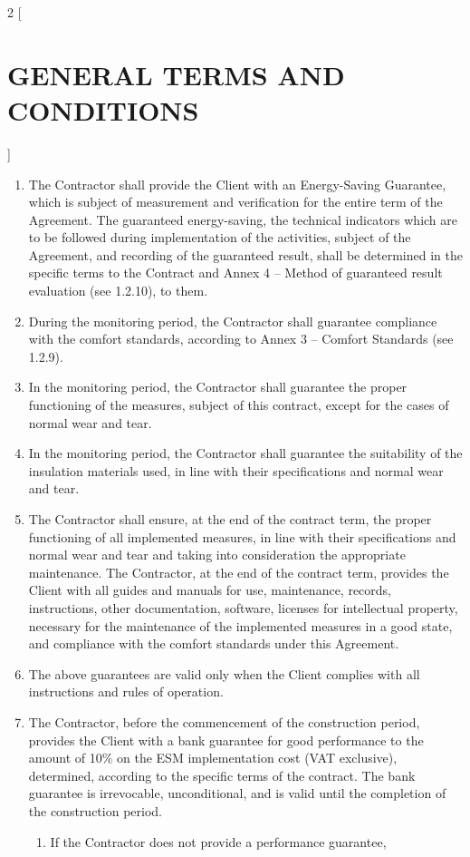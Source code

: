 \begin{multicols}{2} [\section{GENERAL TERMS AND CONDITIONS}]
\begin{enumerate}
  \item The Contractor shall provide the Client with an Energy-Saving
    Guarantee, which is subject of measurement and verification for
    the entire term of the Agreement. The guaranteed energy-saving,
    the technical indicators which are to be followed during
    implementation of the activities, subject of the Agreement, and
    recording of the guaranteed result, shall be determined in the
    specific terms to the Contract and Annex 4 – Method of guaranteed
    result evaluation (see 1.2.10), to them.
  \item During the monitoring period, the Contractor shall guarantee
    compliance with the comfort standards, according to Annex 3 –
    Comfort Standards (see 1.2.9).
  \item In the monitoring period, the Contractor shall guarantee the
    proper functioning of the measures, subject of this contract,
    except for the cases of normal wear and tear.
  \item In the monitoring period, the Contractor shall guarantee the
    suitability of the insulation materials used, in line with their
    specifications and normal wear and tear.
  \item The Contractor shall ensure, at the end of the contract term,
    the proper functioning of all implemented measures, in line with
    their specifications and normal wear and tear and taking into
    consideration the appropriate maintenance. The Contractor, at the
    end of the contract term, provides the Client with all guides and
    manuals for use, maintenance, records, instructions, other
    documentation, software, licenses for intellectual property,
    necessary for the maintenance of the implemented measures in a
    good state, and compliance with the comfort standards under this
    Agreement.
  \item The above guarantees are valid only when the Client complies
    with all instructions and rules of operation.
  \item The Contractor, before the commencement of the construction
    period, provides the Client with a bank guarantee for good
    performance to the amount of 10\% on the ESM implementation cost
    (VAT exclusive), determined, according to the specific terms of
    the contract. The bank guarantee is irrevocable, unconditional,
    and is valid until the completion of the construction period.
    \begin{enumerate}
    \item If the Contractor does not provide a performance guarantee,

\end{enumerate}
\end{enumerate}
\end{multicols}
